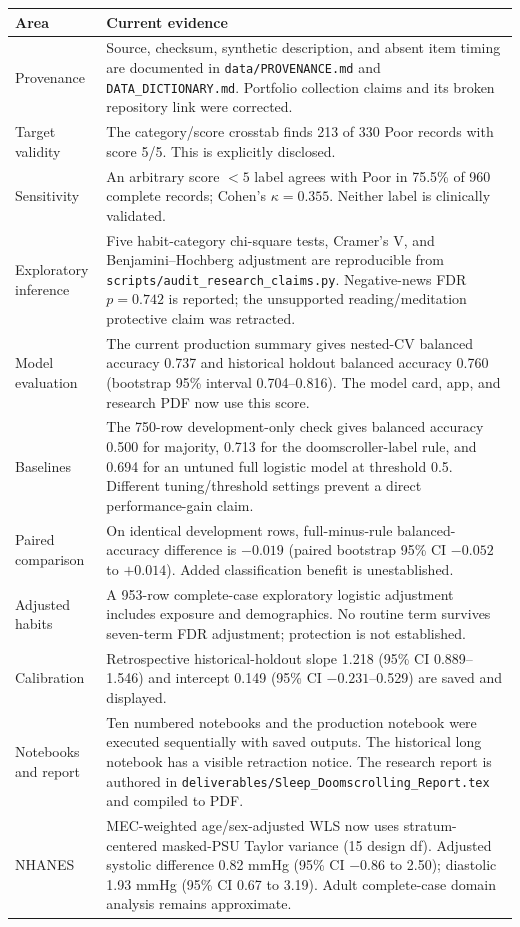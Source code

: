 \documentclass[10pt,a4paper]{article}
\begin{document}
\begin{tabularx}{\linewidth}{p{35mm}X}
\toprule Area & Current evidence \\
\midrule
Provenance & Source, checksum, synthetic description, and absent item timing are documented in \texttt{data/PROVENANCE.md} and \texttt{DATA\_DICTIONARY.md}. Portfolio collection claims and its broken repository link were corrected. \\
Target validity & The category/score crosstab finds 213 of 330 Poor records with score 5/5. This is explicitly disclosed. \\
Sensitivity & An arbitrary score $<5$ label agrees with Poor in 75.5\% of 960 complete records; Cohen's $\kappa=0.355$. Neither label is clinically validated. \\
Exploratory inference & Five habit-category chi-square tests, Cramer's V, and Benjamini--Hochberg adjustment are reproducible from \texttt{scripts/audit\_research\_claims.py}. Negative-news FDR $p=0.742$ is reported; the unsupported reading/meditation protective claim was retracted. \\
Model evaluation & The current production summary gives nested-CV balanced accuracy 0.737 and historical holdout balanced accuracy 0.760 (bootstrap 95\% interval 0.704--0.816). The model card, app, and research PDF now use this score. \\
Baselines & The 750-row development-only check gives balanced accuracy 0.500 for majority, 0.713 for the doomscroller-label rule, and 0.694 for an untuned full logistic model at threshold 0.5. Different tuning/threshold settings prevent a direct performance-gain claim. \\
Paired comparison & On identical development rows, full-minus-rule balanced-accuracy difference is $-0.019$ (paired bootstrap 95\% CI $-0.052$ to $+0.014$). Added classification benefit is unestablished. \\
Adjusted habits & A 953-row complete-case exploratory logistic adjustment includes exposure and demographics. No routine term survives seven-term FDR adjustment; protection is not established. \\
Calibration & Retrospective historical-holdout slope 1.218 (95\% CI 0.889--1.546) and intercept 0.149 (95\% CI $-0.231$--0.529) are saved and displayed. \\
Notebooks and report & Ten numbered notebooks and the production notebook were executed sequentially with saved outputs. The historical long notebook has a visible retraction notice. The research report is authored in \texttt{deliverables/Sleep\_Doomscrolling\_Report.tex} and compiled to PDF. \\
NHANES & MEC-weighted age/sex-adjusted WLS now uses stratum-centered masked-PSU Taylor variance (15 design df). Adjusted systolic difference 0.82 mmHg (95\% CI $-0.86$ to 2.50); diastolic 1.93 mmHg (95\% CI 0.67 to 3.19). Adult complete-case domain analysis remains approximate. \\
\bottomrule
\end{tabularx}
\end{document}
